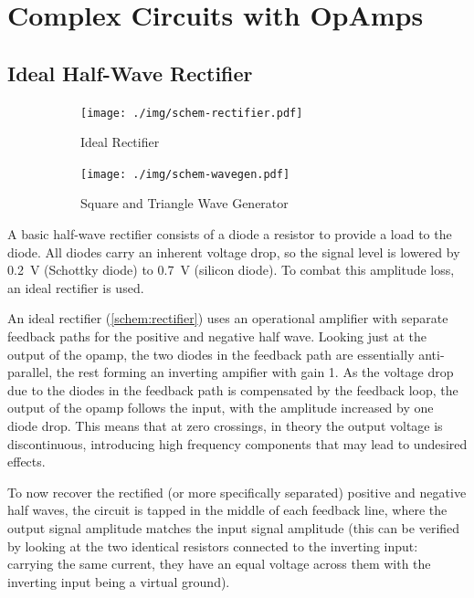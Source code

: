 \chapter{Complex Circuits with OpAmps}
\section{Ideal Half-Wave Rectifier}

\begin{figure}
	\centering
	\begin{subfigure}{0.44\textwidth}
		\centering
		\texttt{[image: ./img/schem-rectifier.pdf]}
		\caption{Ideal Rectifier}
		\label{schem:rectifier}
	\end{subfigure}
	\begin{subfigure}{0.55\textwidth}
		\centering
		\texttt{[image: ./img/schem-wavegen.pdf]}
		\caption{Square and Triangle Wave Generator}
		\label{schem:wavegen}
	\end{subfigure}
	\caption{}
\end{figure}

A basic half-wave rectifier consists of a diode a resistor to provide a load to the diode.
All diodes carry an inherent voltage drop, so the signal level is lowered by \SI{0.2}{\volt} (Schottky diode) to \SI{0.7}{\volt} (silicon diode).
To combat this amplitude loss, an ideal rectifier is used.

An ideal rectifier (\autoref{schem:rectifier}) uses an operational amplifier with separate feedback paths for the positive and negative half wave.
Looking just at the output of the opamp, the two diodes in the feedback path are essentially anti-parallel, the rest forming an inverting ampifier with gain 1.
As the voltage drop due to the diodes in the feedback path is compensated by the feedback loop, the output of the opamp follows the input, with the amplitude increased by one diode drop.
This means that at zero crossings, in theory the output voltage is discontinuous, introducing high frequency components that may lead to undesired effects.

To now recover the rectified (or more specifically separated) positive and negative half waves, the circuit is tapped in the middle of each feedback line, where the output signal amplitude matches the input signal amplitude (this can be verified by looking at the two identical resistors connected to the inverting input: carrying the same current, they have an equal voltage across them with the inverting input being a virtual ground).

